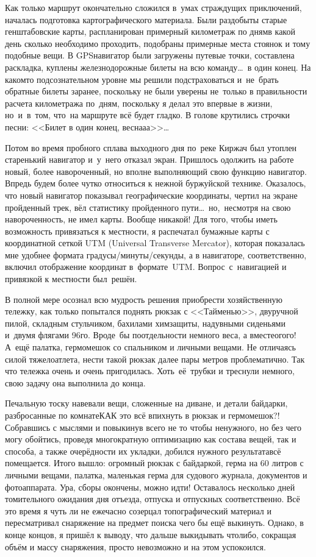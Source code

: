 Как только маршрут окончательно сложился в~умах страждущих приключений, началась подготовка картографического материала. Были раздобыты старые генштабовские карты, распланирован примерный километраж по дням\mdash в какой день сколько необходимо проходить, подобраны примерные места стоянок и тому подобные вещи. В GPS\sdash навигатор были загружены путевые точки, составлена раскладка, куплены железнодорожные билеты на всю команду\ldots~в один конец. На каком\sdash то подсознательном уровне мы решили подстраховаться и~не~брать обратные билеты заранее, поскольку не были уверены не~только в правильности расчета километража по~дням, поскольку я делал это впервые в жизни, но~и~в~том, что~на маршруте всё будет гладко. В голове крутились строчки песни: <<Билет в один конец, весна\sdash а\sdash а>>\ldots
 
Потом во время пробного сплава выходного дня по~реке Киржач был утоплен старенький навигатор и~у~него отказал экран. Пришлось одолжить на работе новый, более навороченный, но вполне выполняющий свою функцию навигатор. Впредь будем более чутко относиться к нежной буржуйской технике. Оказалось, что новый навигатор показывал географические координаты, чертил на экране пройденный трек, вёл статистику пройденного пути\ldots ~но,~несмотря на свою навороченность, не имел карты. Вообще никакой! Для того, чтобы иметь возможность привязаться к местности, я распечатал бумажные карты с координатной сеткой UTM (Universal Transverse Mercator), которая показалась мне удобнее формата градусы/минуты/секунды, а в навигаторе, соответственно, включил отображение координат в~формате~UTM. Вопрос~с~навигацией и привязкой к местности был~решён.

В полной мере осознал всю мудрость решения приобрести хозяйственную тележку, как только попытался поднять рюкзак с <<Тайменью>>, двуручной пилой, складным стульчиком, бахилами химзащиты, надувными сиденьями и~двумя флягами 96\sdash го. Вроде~бы по\sdash отдельности немного веса, а вместе\mdash ого\sdash го! А~ещё палатка, гермомешок со спальником и личными вещами. Не отличаясь силой тяжелоатлета, нести такой рюкзак далее пары метров проблематично. Так что тележка очень и очень пригодилась. Хоть~её~трубки и треснули немного, свою задачу она выполнила до конца.

Печальную тоску навевали вещи, сложенные на диване, и детали байдарки, разбросанные по комнате\mdash КАК это всё впихнуть в рюкзак и гермомешок?! Собравшись с мыслями и повыкинув всего не то чтобы ненужного, но без чего могу обойтись, проведя многократную оптимизацию как состава вещей, так и способа, а также очерёдности их укладки, добился нужного результата\mdash всё помещается. Итого вышло: огромный рюкзак с байдаркой, герма на 60 литров с личными вещами, палатка, маленькая герма для судового журнала, документов и фотоаппарата. Ура, сборы окончены, можно идти!
\newpage
Оставалось несколько дней томительного ожидания дня отъезда, отпуска и отпускных соответственно. Всё это время я чуть ли не ежечасно созерцал топографический материал и пересматривал снаряжение на предмет поиска чего бы ещё выкинуть. Однако, в конце концов, я пришёл к выводу, что дальше выкидывать что\sdash либо, сокращая объём и массу снаряжения, просто невозможно и на этом успокоился.

\begin{center}
\end{center}